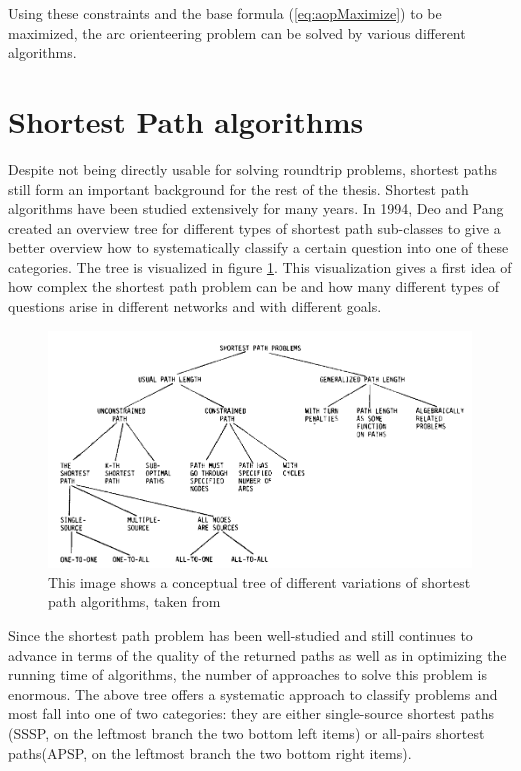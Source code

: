 Using these constraints and the base formula (\ref{eq:aopMaximize}) to be maximized, the arc orienteering problem can be solved by various different algorithms.


\section{Shortest Path algorithms}
\label{sec:shortestPath}

Despite not being directly usable for solving roundtrip problems, shortest paths still form an important background for the rest of the thesis. 
Shortest path algorithms have been studied extensively for many years.
In 1994, Deo and Pang \cite{deo_shortest-path_1984} created an overview tree for different types of shortest path sub-classes to give a better overview how to systematically classify a certain question into one of these categories.
The tree is visualized in figure \ref{fig:shortestPathTaxonomy}.
This visualization gives a first idea of how complex the shortest path problem can be and how many different types of questions arise in different networks and with different goals.


\begin{figure}[ht]
	\centering
	\includegraphics[width=\linewidth]{bilder/shortest path variants tree (Shortest-path algorithms Taxonomy and annotation).png}
	\caption{This image shows a conceptual tree of different variations of shortest path algorithms, taken from \cite{deo_shortest-path_1984}}
	\label{fig:shortestPathTaxonomy}	
\end{figure}

Since the shortest path problem has been well-studied and still continues to advance in terms of the quality of the returned paths as well as in optimizing the running time of algorithms, the number of approaches to solve this problem is enormous.
The above tree offers a systematic approach to classify problems and most fall into one of two categories: they are either single-source shortest paths (SSSP, on the leftmost branch the two bottom left items) or all-pairs shortest paths(APSP, on the leftmost branch the two bottom right items).


